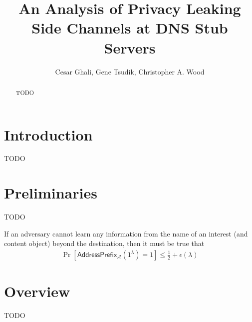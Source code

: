 \documentclass{llncs}
\begin{document}
\mainmatter              %
\title{An Analysis of Privacy Leaking Side Channels at DNS Stub Servers}

\author{Cesar Ghali, Gene Tsudik, Christopher A. Wood}


\maketitle

\begin{abstract}
TODO
\end{abstract}

\section{Introduction}
TODO

\section{Preliminaries}
TODO


If an adversary cannot learn any information from the name of an interest (and content object)
beyond the destination, then it must be true that
\begin{align*}
\Pr[\mathsf{AddressPrefix}_{\mathcal{A}}(1^\lambda) = 1]\leq \frac{1}{2} + \epsilon(\lambda)
\end{align*}

\section{Overview}
TODO
\end{document}
